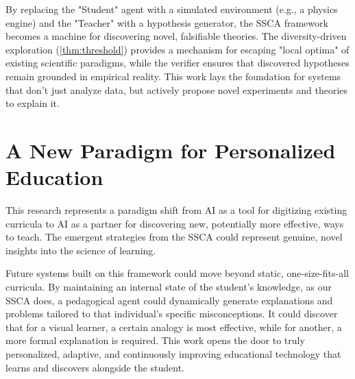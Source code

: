 By replacing the "Student" agent with a simulated environment (e.g., a physics engine) and the "Teacher" with a hypothesis generator, the SSCA framework becomes a machine for discovering novel, falsifiable theories. The diversity-driven exploration (\cref{thm:threshold}) provides a mechanism for escaping "local optima" of existing scientific paradigms, while the verifier ensures that discovered hypotheses remain grounded in empirical reality. This work lays the foundation for systems that don't just analyze data, but actively propose novel experiments and theories to explain it.

\section{A New Paradigm for Personalized Education}
This research represents a paradigm shift from AI as a tool for digitizing existing curricula to AI as a partner for discovering new, potentially more effective, ways to teach. The emergent strategies from the SSCA could represent genuine, novel insights into the science of learning.

Future systems built on this framework could move beyond static, one-size-fits-all curricula. By maintaining an internal state of the student's knowledge, as our SSCA does, a pedagogical agent could dynamically generate explanations and problems tailored to that individual's specific misconceptions. It could discover that for a visual learner, a certain analogy is most effective, while for another, a more formal explanation is required. This work opens the door to truly personalized, adaptive, and continuously improving educational technology that learns and discovers alongside the student.